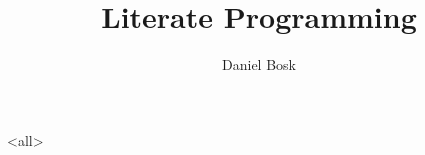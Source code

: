 \title{%
  Literate Programming
}
\author{%
  Daniel Bosk
}

\mode*
\frontmatter

\begin{frame}
  \maketitle
\end{frame}

\begin{abstract}
  
\end{abstract}

\clearpage

\begin{frame}
\end{frame}

\clearpage

\mainmatter

\mode<all>{%





}


\backmatter

\begin{frame}[allowframebreaks]
  \printbibliography
\end{frame}
